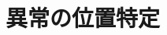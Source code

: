 \documentclass[../main]{subfiles}
\begin{document}
\section{異常の位置特定}
\label{sec:pmethod_anomaly_localization}
\end{document}
